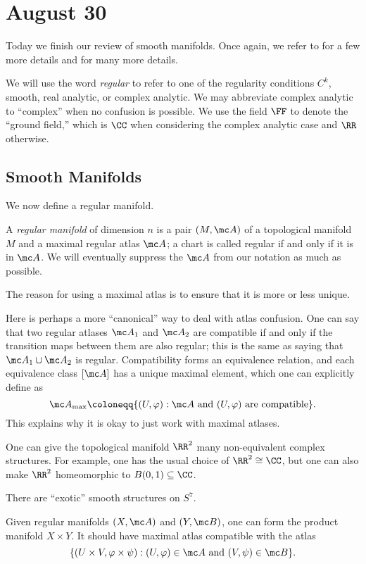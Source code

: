 \documentclass[../notes.tex]{subfiles}
\begin{document}
\section{August 30}

Today we finish our review of smooth manifolds. Once again, we refer to \cite{elber-diff-top} for a few more details and \cite{lee-manifolds} for many more details.
\begin{notation}
	We will use the word \textit{regular} to refer to one of the regularity conditions $C^k$, smooth, real analytic, or complex analytic. We may abbreviate complex analytic to ``complex'' when no confusion is possible. We use the field $\FF$ to denote the ``ground field,'' which is $\CC$ when considering the complex analytic case and $\RR$ otherwise.
\end{notation}

\subsection{Smooth Manifolds}
We now define a regular manifold.
\begin{definition}
	A \textit{regular manifold} of dimension $n$ is a pair $(M,\mc A)$ of a topological manifold $M$ and a maximal regular atlas $\mc A$; a chart is called regular if and only if it is in $\mc A$. We will eventually suppress the $\mc A$ from our notation as much as possible.
\end{definition}
The reason for using a maximal atlas is to ensure that it is more or less unique.
\begin{remark}
	Here is perhaps a more ``canonical'' way to deal with atlas confusion. One can say that two regular atlases $\mc A_1$ and $\mc A_2$ are compatible if and only if the transition maps between them are also regular; this is the same as saying that $\mc A_1\cup\mc A_2$ is regular. Compatibility forms an equivalence relation, and each equivalence class $[\mc A]$ has a unique maximal element, which one can explicitly define as
	\[\mc A_{\mathrm{max}}\coloneqq\{(U,\varphi):\mc A\text{ and }(U,\varphi)\text{ are compatible}\}.\]
	This explains why it is okay to just work with maximal atlases.
\end{remark}
\begin{example}
	One can give the topological manifold $\RR^2$ many non-equivalent complex structures. For example, one has the usual choice of $\RR^2\cong\CC$, but one can also make $\RR^2$ homeomorphic to $B(0,1)\subseteq\CC$.
\end{example}
\begin{example}
	There are ``exotic'' smooth structures on $S^7$.
\end{example}
\begin{example}
	Given regular manifolds $(X,\mc A)$ and $(Y,\mc B)$, one can form the product manifold $X\times Y$. It should have maximal atlas compatible with the atlas
	\[\{(U\times V,\varphi\times\psi):(U,\varphi)\in\mc A\text{ and }(V,\psi)\in\mc B\}.\]
\end{example}
\end{document}
